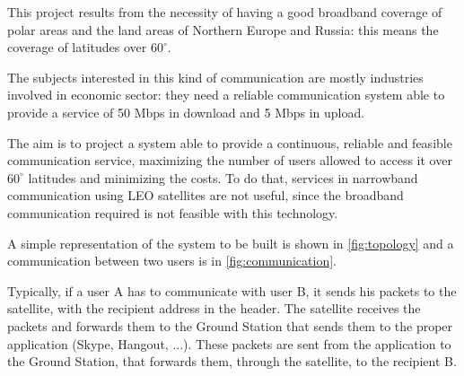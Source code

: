 This project results from the necessity of having a good broadband coverage of polar
areas and the land areas of Northern Europe and Russia: this means the coverage of
latitudes over $60^\circ$.

The subjects interested in this kind of communication are
mostly industries involved in economic sector: they need a reliable communication system able to provide a service of 50 Mbps in download and 5 Mbps in upload.


The aim is to project a system able to provide a continuous, reliable and feasible communication service, maximizing the number of users allowed to access it over $60^\circ$
latitudes and minimizing the costs. To do that, services in narrowband communication using LEO satellites are not useful, since the broadband communication required is not feasible with this technology.

A simple representation of the system to be built is shown in \autoref{fig:topology} and a communication between two users is in \autoref{fig:communication}.

Typically, if a user A has to communicate with user B, it sends his packets to the satellite, with the recipient address in the header.
The satellite receives the packets and forwards them to the Ground Station that sends them to the proper application (Skype, Hangout, ...).
These packets are sent from the application to the Ground Station, that forwards them, through the satellite, to the recipient B.
